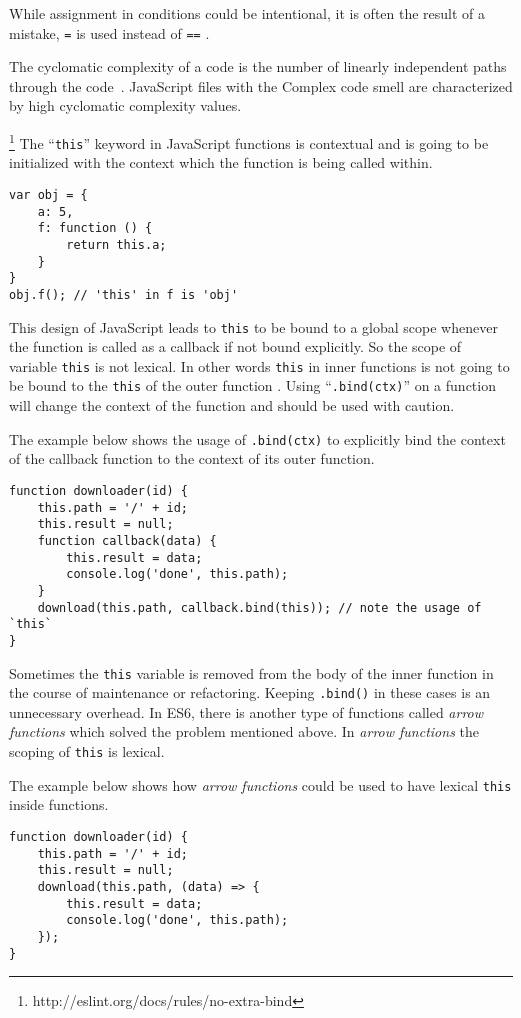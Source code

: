 While assignment in conditions could be intentional, it is often the result of a mistake, \ie{} \texttt{=} is used instead of \texttt{==} \cite{seticert}.

 The cyclomatic complexity of a code is the number of linearly independent paths through the code~\cite{mccabe1976complexity}. JavaScript files with the Complex code smell are characterized by high cyclomatic complexity values. %


\footnote{http://eslint.org/docs/rules/no-extra-bind} The ``\texttt{this}'' keyword in JavaScript functions is contextual and is going to be initialized with the context which the function is being called within.
\begin{lstlisting}
var obj = {
	a: 5,
	f: function () {
		return this.a;
	}
}
obj.f(); // 'this' in f is 'obj'
\end{lstlisting}

This design of JavaScript leads to \texttt{this} to be bound to a global scope whenever the function is called as a callback if not bound explicitly. So the scope of variable \texttt{this} is not lexical. In other words \texttt{this} in inner functions is not going to be bound to the \texttt{this} of the outer function \cite{fard2013jsnose}. Using ``\texttt{.bind(ctx)}'' on a function will change the context of the function and should be used with caution.

The example below shows the usage of \texttt{.bind(ctx)} to explicitly bind the context of the callback function to the context of its outer function.
\begin{lstlisting}
function downloader(id) {
	this.path = '/' + id;
	this.result = null;
	function callback(data) {
		this.result = data;
		console.log('done', this.path);
	}
	download(this.path, callback.bind(this)); // note the usage of `this`
}
\end{lstlisting}

Sometimes the \texttt{this} variable is removed from the body of the inner function in the course of maintenance or refactoring. Keeping \texttt{.bind()} in these cases is an unnecessary overhead. In ES6, there is another type of functions called \emph{arrow functions} which solved the problem mentioned above. In \emph{arrow functions} the scoping of \texttt{this} is lexical.

The example below shows how \emph{arrow functions} could be used to have lexical \texttt{this} inside functions.
\begin{lstlisting}
function downloader(id) {
	this.path = '/' + id;
	this.result = null;
	download(this.path, (data) => {
		this.result = data;
		console.log('done', this.path);
	});
}
\end{lstlisting}


